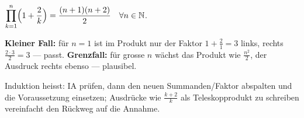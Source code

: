 \begin{ergebnis}
$\displaystyle\prod_{k=1}^{n}\Bigl(1+\frac2k\Bigr)=\frac{(n+1)(n+2)}2\quad\forall n\in\mathbb N$.
\end{ergebnis}

\begin{kontrolle}
\textbf{Kleiner Fall:} für $n=1$ ist im Produkt nur der Faktor $1+\frac21=3$
links, rechts $\frac{2\cdot3}{2}=3$ — passt. \textbf{Grenzfall:} für grosse
$n$ wächst das Produkt wie $\frac{n^2}{2}$, der Ausdruck rechts ebenso —
plausibel.
\end{kontrolle}

\begin{merksatz}
Induktion heisst: IA prüfen, dann den neuen Summanden/Faktor abspalten und die
Voraussetzung einsetzen; Ausdrücke wie $\frac{k+2}{k}$ als Teleskopprodukt zu
schreiben vereinfacht den Rückweg auf die Annahme.
\end{merksatz}
